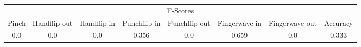\documentclass{standalone}
\begin{document}
 
 \begin{tabular}{|c|c|c|c|c|c|c ||c|}
\cline{1-8}\multicolumn{8}{|c|}{F-Scores} \\ 
\cline{1-8}Pinch & Handflip out & Handflip in & Punchflip in & Punchflip out & Fingerwave in & Fingerwave out & Accuracy\\ 
\cline{1-8}0.0 & 0.0 & 0.0 & 0.356 & 0.0 & 0.659 & 0.0 & 0.333\\ 
 \cline{1-8}\hline \end{tabular}
 
\end{document}
